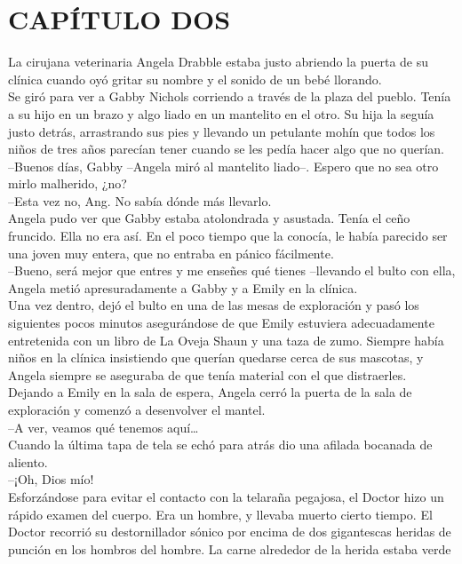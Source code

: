\chapter*{CAPÍTULO DOS}
La cirujana veterinaria Angela Drabble estaba justo abriendo la puerta
de su clínica cuando oyó gritar su nombre y el sonido de un bebé
llorando.\\
Se giró para ver a Gabby Nichols corriendo a través de la plaza del
pueblo. Tenía a su hijo en un brazo y algo liado en un mantelito en el
otro. Su hija la seguía justo detrás, arrastrando sus pies y llevando un
petulante mohín que todos los niños de tres años parecían tener cuando
se les pedía hacer algo que no querían.\\
--Buenos días, Gabby --Angela miró al mantelito liado--. Espero que no
sea otro mirlo malherido, ¿no?\\
--Esta vez no, Ang. No sabía dónde más llevarlo.\\
Angela pudo ver que Gabby estaba atolondrada y asustada. Tenía el ceño
fruncido. Ella no era así. En el poco tiempo que la conocía, le había
parecido ser una joven muy entera, que no entraba en pánico
fácilmente.\\
--Bueno, será mejor que entres y me enseñes qué tienes --llevando el
bulto con ella, Angela metió apresuradamente a Gabby y a Emily en la
clínica.\\
Una vez dentro, dejó el bulto en una de las mesas de exploración y pasó
los siguientes pocos minutos asegurándose de que Emily estuviera
adecuadamente entretenida con un libro de La Oveja Shaun y una taza de
zumo. Siempre había niños en la clínica insistiendo que querían quedarse
cerca de sus mascotas, y Angela siempre se aseguraba de que tenía
material con el que distraerles.\\
Dejando a Emily en la sala de espera, Angela cerró la puerta de la sala
de exploración y comenzó a desenvolver el mantel.\\
--A ver, veamos qué tenemos aquí\ldots{}\\
Cuando la última tapa de tela se echó para atrás dio una afilada
bocanada de aliento.\\
--¡Oh, Dios mío!\\[2\baselineskip]Esforzándose para evitar el contacto
con la telaraña pegajosa, el Doctor hizo un rápido examen del cuerpo.
Era un hombre, y llevaba muerto cierto tiempo. El Doctor recorrió su
destornillador sónico por encima de dos gigantescas heridas de punción
en los hombros del hombre. La carne alrededor de la herida estaba verde

